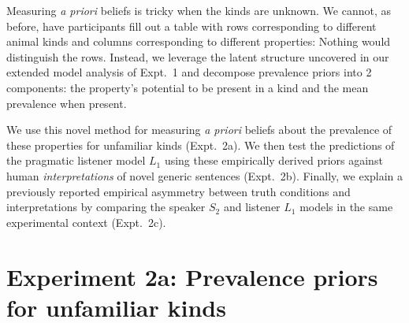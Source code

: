\documentclass[12pt,letterpaper]{article}
\begin{document}
Measuring \emph{a priori} beliefs is tricky when the kinds are unknown.
We cannot, as before, have participants fill out a table with rows corresponding to different animal kinds and columns corresponding to different properties:  Nothing would distinguish the rows.
Instead, we leverage the latent structure uncovered in our extended model analysis of Expt.~1 and decompose prevalence priors into 2 components: the property's potential to be present in a kind and the mean prevalence when present.

We use this novel method for measuring \emph{a priori} beliefs about the prevalence of these properties for unfamiliar kinds (Expt.~2a).
We then test the predictions of the pragmatic listener model $L_1$ using these empirically derived priors against human \emph{interpretations} of novel generic sentences (Expt.~2b).
Finally, we explain a previously reported empirical asymmetry between truth conditions and interpretations by comparing the speaker $S_2$ and listener $L_1$ models in the same experimental context (Expt.~2c).




\section*{Experiment 2a: Prevalence priors for unfamiliar kinds}

%

%
%
%
\end{document}
